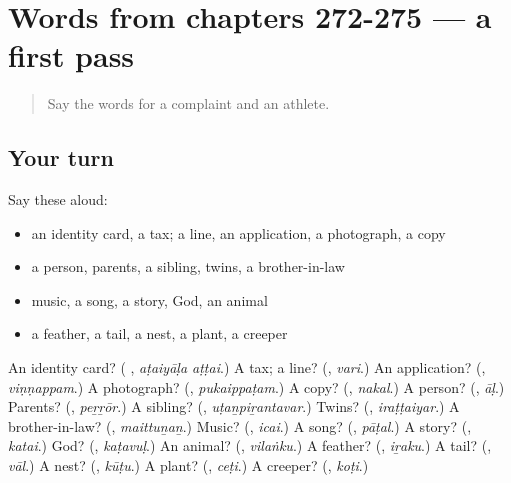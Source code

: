 \section[(dialogue)]{Words from chapters 272-275 — a first pass}

\label{lesson:TA-R280-first-pass-words-from-chapters-272-275}



\begin{quote}
Say the words for a complaint and an athlete.
\end{quote}

\subsection*{Your turn}
Say these aloud:

\begin{itemize}
\raggedright
  \item an identity card, a tax; a line, an application, a photograph, a copy
  \item a person, parents, a sibling, twins, a brother-in-law
  \item music, a song, a story, God, an animal
  \item a feather, a tail, a nest, a plant, a creeper
\end{itemize}

\begin{tcolorbox}[breakable,colback=teal!4,colframe=teal!35!black,title={Before you move on}]
An identity card? (\textbf{ }, \emph{aṭaiyāḷa aṭṭai}.) A tax; a line? (\textbf{}, \emph{vari}.) An application? (\textbf{}, \emph{viṇṇappam}.) A photograph? (\textbf{}, \emph{pukaippaṭam}.) A copy? (\textbf{}, \emph{nakal}.) A person? (\textbf{}, \emph{āḷ}.) Parents? (\textbf{}, \emph{peṟṟōr}.) A sibling? (\textbf{}, \emph{uṭaṉpiṟantavar}.) Twins? (\textbf{}, \emph{iraṭṭaiyar}.) A brother-in-law? (\textbf{}, \emph{maittuṉaṉ}.) Music? (\textbf{}, \emph{icai}.) A song? (\textbf{}, \emph{pāṭal}.) A story? (\textbf{}, \emph{katai}.) God? (\textbf{}, \emph{kaṭavuḷ}.) An animal? (\textbf{}, \emph{vilaṅku}.) A feather? (\textbf{}, \emph{iṟaku}.) A tail? (\textbf{}, \emph{vāl}.) A nest? (\textbf{}, \emph{kūṭu}.) A plant? (\textbf{}, \emph{ceṭi}.) A creeper? (\textbf{}, \emph{koṭi}.)
\end{tcolorbox}

